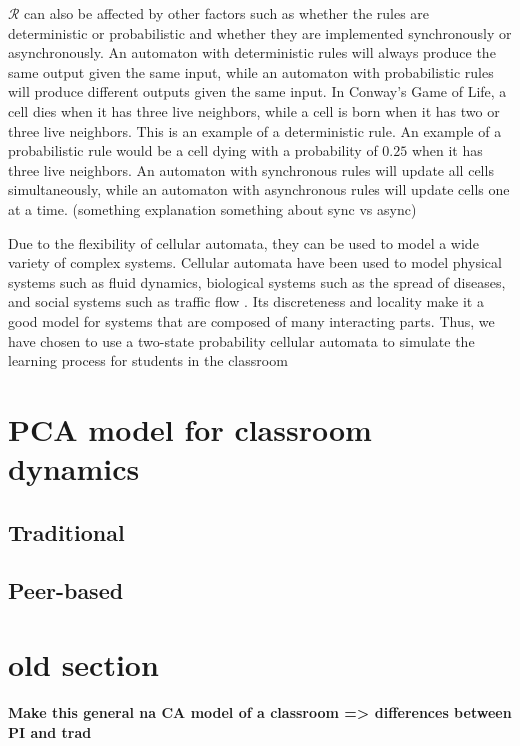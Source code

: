 $\mathcal{R}$ can also be affected by other factors such as whether the rules are deterministic or probabilistic and whether they are implemented synchronously or asynchronously. An automaton with deterministic rules will always produce the same output given the same input, while an automaton with probabilistic rules will produce different outputs given the same input. In Conway's Game of Life, a cell dies when it has three live neighbors, while a cell is born when it has two or three live neighbors. This is an example of a deterministic rule. An example of a probabilistic rule would be a cell dying with a probability of $0.25$ when it has three live neighbors. An automaton with synchronous rules will update all cells simultaneously, while an automaton with asynchronous rules will update cells one at a time. (something explanation something about sync vs async)


Due to the flexibility of cellular automata, they can be used to model a wide variety of complex systems. Cellular automata have been used to model physical systems such as fluid dynamics, biological systems such as the spread of diseases, and social systems such as traffic flow \cite{louis2018probabilistic}. Its discreteness and locality make it a good model for systems that are composed of many interacting parts. Thus, we have chosen to use a two-state probability cellular automata to simulate the learning process for students in the classroom


\section{PCA model for classroom dynamics}
\subsection{Traditional}
\subsection{Peer-based}

\section{old section}
\textbf{Make this general na CA model of a classroom => differences between PI and trad}

